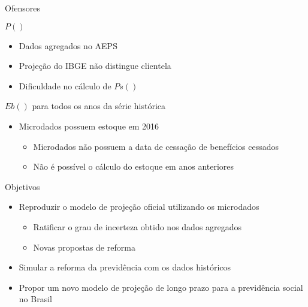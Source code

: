 \begin{frame}{Ofensores}
  \begin{block}{$P()$}
    \begin{itemize}
      \item Dados agregados no AEPS
      \item Projeção do IBGE não distingue clientela
      \item Dificuldade no cálculo de $Ps()$
    \end{itemize}
  \end{block}
  \begin{block}{$Eb()$ para todos os anos da série histórica}
    \begin{itemize}
      \item Microdados possuem estoque em 2016
      \begin{itemize}
        \item Microdados não possuem a data de cessação de benefícios cessados
        \item Não é possível o cálculo do estoque em anos anteriores
      \end{itemize}
    \end{itemize}
  \end{block}
\end{frame}

\begin{frame}
  \begin{block}{Objetivos}
    \begin{itemize}
      \item Reproduzir o modelo de projeção oficial utilizando os microdados
      \begin{itemize}
        \item Ratificar o grau de incerteza obtido nos dados agregados
        \item \alert{Novas propostas de reforma}
      \end{itemize}
      \item \alert{Simular a reforma da previdência com os dados históricos}
      \item Propor um novo modelo de projeção de longo prazo para a previdência
      social no Brasil
    \end{itemize}
  \end{block}
\end{frame}

